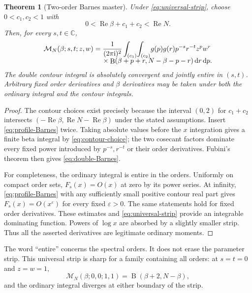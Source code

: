 \documentclass[11pt]{article}
\numberwithin{equation}{section}
\newtheorem{theorem}{Theorem}[section]
\theoremstyle{definition}
\DeclareMathOperator{\Rea}{Re}
\DeclareMathOperator{\B}{B}
\newcommand{\C}{\mathbb C}
\newcommand{\dd}{\,\mathrm d}
\newcommand{\ii}{\mathrm i}
\newcommand{\MM}{\mathcal M}
\begin{document}
\begin{theorem}[Two-order Barnes master]\label{thm:double-Barnes}
Under \eqref{eq:universal-strip}, choose $0<c_1,c_2<1$ with
\begin{equation}\label{eq:contour-choice}
 0<\Rea\beta+c_1+c_2<\Rea N.
\end{equation}
Then, for every $s,t\in\C$,
\begin{align}\label{eq:double-Barnes}
 \MM_N(\beta;s,t;z,w)
 =\frac1{(2\pi\ii)^2}\int_{(c_1)}\!\int_{(c_2)}
 &g(p)g(r)p^{-s}r^{-t}z^pw^r\\[-6pt]
 &\hspace{-25mm}\times\B(\beta+p+r,N-\beta-p-r)\dd r\dd p.\notag
\end{align}
The double contour integral is absolutely convergent and jointly entire in $(s,t)$. Arbitrary fixed order derivatives and $\beta$ derivatives may be taken under both the ordinary integral and the contour integrals.
\end{theorem}
\begin{proof}
The contour choices exist precisely because the interval $(0,2)$ for $c_1+c_2$ intersects $(-\Rea\beta,\Rea N-\Rea\beta)$ under the stated assumptions. Insert \eqref{eq:profile-Barnes} twice. Taking absolute values before the $x$ integration gives a finite beta integral by \eqref{eq:contour-choice}; the two cosecant factors dominate every fixed power introduced by $p^{-s},r^{-t}$ or their order derivatives. Fubini's theorem then gives \eqref{eq:double-Barnes}.

For completeness, the ordinary integral is entire in the orders. Uniformly on compact order sets, $F_s(x)=O(x)$ at zero by its power series. At infinity, \eqref{eq:profile-Barnes} with any sufficiently small positive contour real part gives $F_s(x)=O(x^\varepsilon)$ for every fixed $\varepsilon>0$. The same statements hold for fixed order derivatives. These estimates and \eqref{eq:universal-strip} provide an integrable dominating function. Powers of $\log x$ are absorbed by a slightly smaller strip. Thus all the asserted derivatives are legitimate ordinary moments.
\end{proof}

The word ``entire'' concerns the spectral orders. It does not erase the parameter strip. This universal strip is sharp for a family containing all orders: at $s=t=0$ and $z=w=1$,
\begin{equation}\label{eq:beta-control}
 \MM_N(\beta;0,0;1,1)=\B(\beta+2,N-\beta),
\end{equation}
and the ordinary integral diverges at either boundary of the strip.
\end{document}
